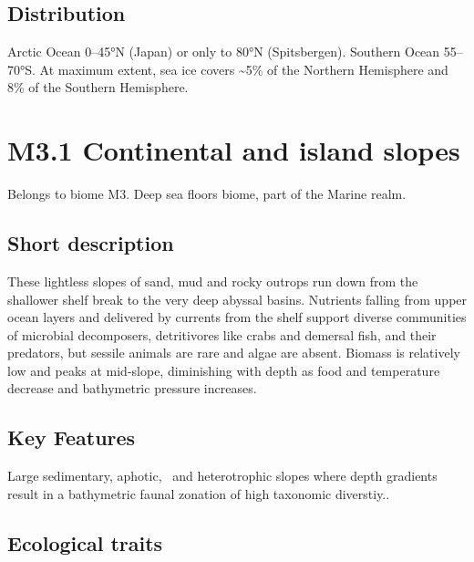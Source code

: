 \documentclass[
  letterpaper,
  DIV=11,
  numbers=noendperiod]{scrartcl}
\begin{document}
\subsection{Distribution}\label{distribution-39}

Arctic Ocean 0--45°N (Japan) or only to 80°N (Spitsbergen). Southern
Ocean 55--70°S. At maximum extent, sea ice covers \textasciitilde5\% of
the Northern Hemisphere and 8\% of the Southern Hemisphere.

\section{M3.1 Continental and island
slopes}\label{m3.1-continental-and-island-slopes}

Belongs to biome M3. Deep sea floors biome, part of the Marine realm.

\subsection{Short description}\label{short-description-40}

These lightless slopes of sand, mud and rocky outrops run down from the
shallower shelf break to the very deep abyssal basins. Nutrients falling
from upper ocean layers and delivered by currents from the shelf support
diverse communities of microbial decomposers, detritivores like crabs
and demersal fish, and their predators, but sessile animals are rare and
algae are absent. Biomass is relatively low and peaks at mid-slope,
diminishing with depth as food and temperature decrease and bathymetric
pressure increases.

\subsection{Key Features}\label{key-features-40}

Large sedimentary, aphotic,~ and heterotrophic slopes where depth
gradients result in a bathymetric faunal zonation of high taxonomic
diverstiy..

\subsection{Ecological traits}\label{ecological-traits-40}
\end{document}
